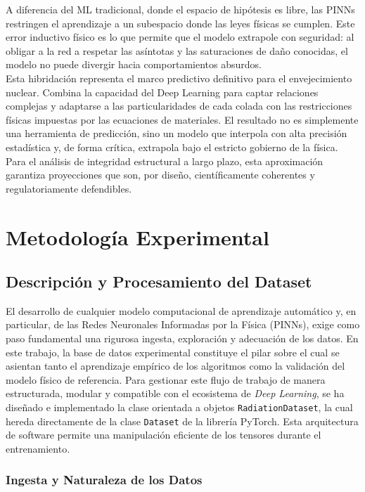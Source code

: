 \documentclass[a4paper, 12pt, twocolumn]{book}
\begin{document}
A diferencia del ML tradicional, donde el espacio de hipótesis es libre, las PINNs restringen el aprendizaje a un subespacio donde las leyes físicas se cumplen. Este error inductivo físico es lo que permite que el modelo extrapole con seguridad: al obligar a la red a respetar las asíntotas y las saturaciones de daño conocidas, el modelo no puede divergir hacia comportamientos absurdos. \\

Esta hibridación representa el marco predictivo definitivo para el envejecimiento nuclear. Combina la capacidad del Deep Learning para captar relaciones complejas y adaptarse a las particularidades de cada colada con las restricciones físicas impuestas por las ecuaciones de materiales. El resultado no es simplemente una herramienta de predicción, sino un modelo que interpola con alta precisión estadística y, de forma crítica, extrapola bajo el estricto gobierno de la física. Para el análisis de integridad estructural a largo plazo, esta aproximación garantiza proyecciones que son, por diseño, científicamente coherentes y regulatoriamente defendibles.

\chapter{Metodología Experimental}

\section{Descripción y Procesamiento del Dataset}

El desarrollo de cualquier modelo computacional de aprendizaje automático y, en particular, de las Redes Neuronales Informadas por la Física (PINNs), exige como paso fundamental una rigurosa ingesta, exploración y adecuación de los datos. En este trabajo, la base de datos experimental constituye el pilar sobre el cual se asientan tanto el aprendizaje empírico de los algoritmos como la validación del modelo físico de referencia. Para gestionar este flujo de trabajo de manera estructurada, modular y compatible con el ecosistema de \textit{Deep Learning}, se ha diseñado e implementado la clase orientada a objetos \texttt{RadiationDataset}, la cual hereda directamente de la clase \texttt{Dataset} de la librería PyTorch. Esta arquitectura de software permite una manipulación eficiente de los tensores durante el entrenamiento.

\subsection{Ingesta y Naturaleza de los Datos}
\end{document}
